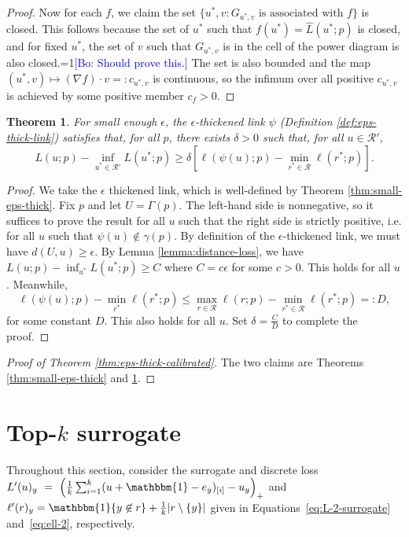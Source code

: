 \documentclass[12pt]{article}
\newcommand{\Comments}{1}
\newcommand{\mynote}[2]{\ifnum\Comments=1\textcolor{#1}{#2}\fi}
\newcommand{\bo}[1]{\mynote{blue}{[Bo: #1]}}
\newcommand{\R}{\mathcal{R}}
\newcommand{\ones}{\mathbbm{1}}
\newcommand{\Ind}[1]{\ones\{#1\}}
\newtheorem{theorem}{Theorem}
\begin{document}
\begin{proof}
  Now for each $f$, we claim the set $\{u^*, v : \text{$G_{u^*,v}$ is associated with $f$}\}$ is closed.
  This follows because the set of $u^*$ such that $f(u^*) = \hat{L}(u^*;p)$ is closed, and for fixed $u^*$, the set of $v$ such that $G_{u^*,v}$ is in the cell of the power diagram is also closed.\bo{Should prove this.}
  The set is also bounded and the map $(u^*,v) \mapsto (\nabla f)\cdot v =: c_{u^*,v}$ is continuous, so the infimum over all positive $c_{u^*,v}$ is achieved by some positive member $c_f > 0$.
\end{proof}

\begin{theorem} \label{thm:app-eps-thick-sep}
  For small enough $\epsilon$, the $\epsilon$-thickened link $\psi$ (Definition \ref{def:eps-thick-link}) satisfies that, for all $p$, there exists $\delta > 0$ such that, for all $u \in \R'$,
    \[ L(u;p) - \inf_{u^* \in \R'} L(u^*;p) \geq \delta \left[ \ell(\psi(u);p) - \min_{r^* \in \R} \ell(r^*;p) \right] . \]
\end{theorem}
\begin{proof}
  We take the $\epsilon$ thickened link, which is well-defined by Theorem \ref{thm:small-eps-thick}.
  Fix $p$ and let $U = \Gamma(p)$.
  The left-hand side is nonnegative, so it suffices to prove the result for all $u$ such that the right side is strictly positive, i.e. for all $u$ such that $\psi(u) \not\in \gamma(p)$.
  By definition of the $\epsilon$-thickened link, we must have $d(U,u) \geq \epsilon$.
  By Lemma \ref{lemma:distance-loss}, we have $L(u;p) - \inf_{u^*} L(u^*;p) \geq C$ where $C = c\epsilon$ for some $c > 0$.
  This holds for all $u$.
  Meanwhile,
    \[ \ell(\psi(u);p) - \min_{r^*} \ell(r^*;p) \leq \max_{r \in \R} \ell(r;p) - \min_{r^* \in \R} \ell(r^*;p) =: D, \]
  for some constant $D$.
  This also holds for all $u$.
  Set $\delta = \frac{C}{D}$ to complete the proof.
\end{proof}

\begin{proof}[Proof of Theorem \ref{thm:eps-thick-calibrated}]
  The two claims are Theorems \ref{thm:small-eps-thick} and \ref{thm:app-eps-thick-sep}.
\end{proof}


\section{Top-$k$ surrogate}
Throughout this section, consider the surrogate and discrete loss $L'(u)_y~=~\left(\frac{1}{k} \sum_{i=1}^k (u + \ones - e_y)_{[i]} - u_y \right)_+$ and $\ell'(r)_y = \Ind{y \not\in r} + \frac{1}{k} |r \setminus \{y\}|$ given in Equations~\ref{eq:L-2-surrogate} and~\ref{eq:ell-2}, respectively.
\end{document}
